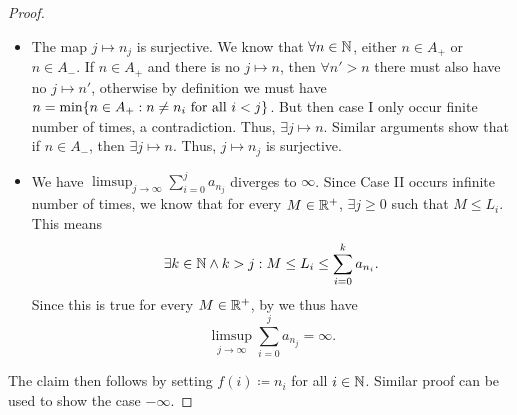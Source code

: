 \begin{proof}
\begin{itemize}
          Now Suppose for the sake of contradiction that Case II only occurs finite number of times.
          Let \(j\) be the largest number such that Case II occurs, i.e.,
          \[
            \Bigg(\sum_{0 \leq i < j} a_{n_i} \geq L_j\Bigg) \land \Bigg(\sum_{0 \leq i \leq j} a_{n_i} < L_j\Bigg).
          \]
          Then \(\forall k \in \N\) and \(k > j\), Case I occurs, i.e.,
          \[
            S_k = \sum_{i = 0}^k a_{n_i} < L_k.
          \]
          Since Case I occurs, we know that \(S_k\) is increasing.
          Thus
          \begin{align*}
                     & S_k < S_{k + 1} < L_{k + 1} = L_k                                                                          \\
            \implies & \lim_{k \to \infty} S_k \text{ converges}               &                                 & \by{i:6.3.8}   \\
            \implies & \sum_{k = j + 1}^\infty a_{n_k} \text{ converges}       &                                 & \by{i:7.2.2}   \\
            \implies & \sum_{k = j + 1}^\infty \abs{a_{n_k}} \text{ converges} & (\forall k > j, a_{n_k} \geq 0)                  \\
            \implies & \sum_{k \in A_+} \abs{a_k} \text{ converges}            &                                 & \by{i:8.2.6.c}
          \end{align*}
          But we know that \(\sum_{k \in A_+} \abs{a_k}\) is not absolutely convergent, a contradiction.
          Thus, case II must occurs infinite number of times.
          We conclude that both Case I and II occur infinite number of times.
    \item The map \(j \mapsto n_j\) is surjective.
          We know that \(\forall n \in \mathbb{N}\), either \(n \in A_+\) or \(n \in A_-\).
          If \(n \in A_+\) and there is no \(j \mapsto n\), then \(\forall n' > n\) there must also have no \(j \mapsto n'\), otherwise by definition we must have \(n = \min\set{n \in A_+ : n \neq n_i \text{ for all } i < j}\).
          But then case I only occur finite number of times, a contradiction.
          Thus, \(\exists j \mapsto n\).
          Similar arguments show that if \(n \in A_-\), then \(\exists j \mapsto n\).
          Thus, \(j \mapsto n_j\) is surjective.
    \item We have \(\limsup_{j \to \infty} \sum_{i = 0}^j a_{n_j}\) diverges to \(\infty\).
          Since Case II occurs infinite number of times, we know that for every \(M \in \mathbb{R}^+\), \(\exists j \geq 0\) such that \(M \leq L_i\).
          This means
          \[
            \exists k \in \mathbb{N} \land k > j : M \leq L_i \leq \sum_{i = 0}^k a_{n_i}.
          \]
          Since this is true for every \(M \in \mathbb{R}^+\), by  we thus have
          \[
            \limsup_{j \to \infty} \sum_{i = 0}^j a_{n_j} = \infty.
          \]
  \end{itemize}
  The claim then follows by setting \(f(i) \coloneqq n_i\) for all \(i \in \mathbb{N}\).
  Similar proof can be used to show the case \(-\infty\).
\end{proof}
